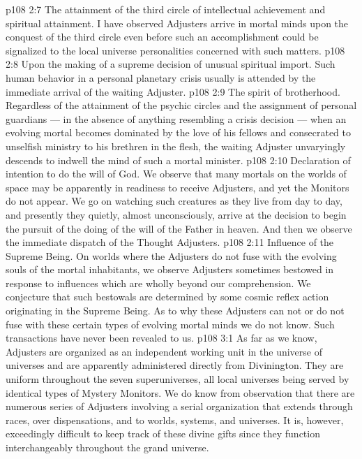 \vs p108 2:7 \pc {}\bibnobreakspace The attainment of the third circle of intellectual achievement and spiritual attainment. I have observed Adjusters arrive in mortal minds upon the conquest of the third circle even before such an accomplishment could be signalized to the local universe personalities concerned with such matters.
\vs p108 2:8 \pc {}\bibnobreakspace Upon the making of a supreme decision of unusual spiritual import. Such human behavior in a personal planetary crisis usually is attended by the immediate arrival of the waiting Adjuster.
\vs p108 2:9 \pc {}\bibnobreakspace The spirit of brotherhood. Regardless of the attainment of the psychic circles and the assignment of personal guardians --- in the absence of anything resembling a crisis decision --- when an evolving mortal becomes dominated by the love of his fellows and consecrated to unselfish ministry to his brethren in the flesh, the waiting Adjuster unvaryingly descends to indwell the mind of such a mortal minister.
\vs p108 2:10 \pc {}\bibnobreakspace Declaration of intention to do the will of God. We observe that many mortals on the worlds of space may be apparently in readiness to receive Adjusters, and yet the Monitors do not appear. We go on watching such creatures as they live from day to day, and presently they quietly, almost unconsciously, arrive at the decision to begin the pursuit of the doing of the will of the Father in heaven. And then we observe the immediate dispatch of the Thought Adjusters.
\vs p108 2:11 \pc {}\bibnobreakspace Influence of the Supreme Being. On worlds where the Adjusters do not fuse with the evolving souls of the mortal inhabitants, we observe Adjusters sometimes bestowed in response to influences which are wholly beyond our comprehension. We conjecture that such bestowals are determined by some cosmic reflex action originating in the Supreme Being. As to why these Adjusters can not or do not fuse with these certain types of evolving mortal minds we do not know. Such transactions have never been revealed to us.
\vs p108 3:1 As far as we know, Adjusters are organized as an independent working unit in the universe of universes and are apparently administered directly from Divinington. They are uniform throughout the seven superuniverses, all local universes being served by identical types of Mystery Monitors. We do know from observation that there are numerous series of Adjusters involving a serial organization that extends through races, over dispensations, and to worlds, systems, and universes. It is, however, exceedingly difficult to keep track of these divine gifts since they function interchangeably throughout the grand universe.
